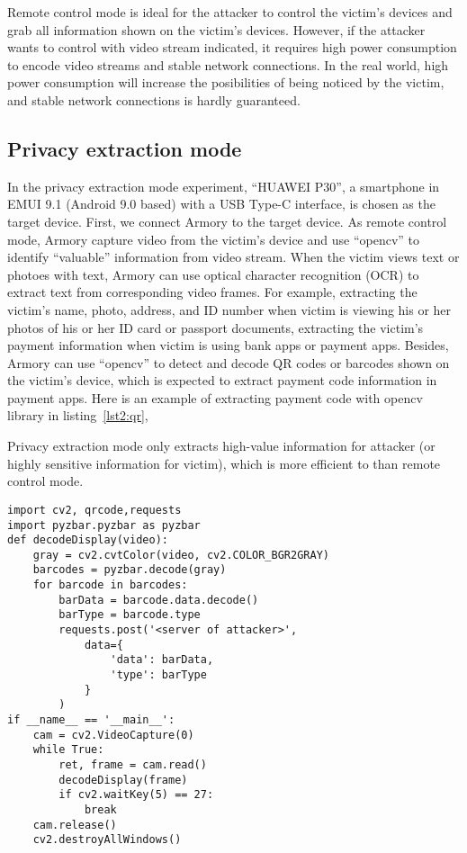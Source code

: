 Remote control mode is ideal for the attacker to control the victim's devices and grab all information shown on the victim's devices. However, if the attacker wants to control with video stream indicated, it requires high power consumption to encode video streams and stable network connections. In the real world, high power consumption will increase the posibilities of being noticed by the victim, and stable network connections is hardly guaranteed.


\subsection{Privacy extraction mode}

In the privacy extraction mode experiment, ``HUAWEI P30'', a smartphone in EMUI 9.1 (Android 9.0 based) with a USB Type-C interface, is chosen as the target device. First, we connect Armory to the target device. As remote control mode, Armory capture video from the victim's device and use ``opencv'' to identify ``valuable'' information from video stream. When the victim views text or photoes with text, Armory can use optical character recognition (OCR) to extract text from corresponding video frames.  
For example, extracting the victim's name, photo, address, and ID number when victim is viewing his or her photos of his or her ID card or passport documents,
extracting the victim's payment information when victim is using bank apps or payment apps. Besides, Armory can use ``opencv'' to detect and decode QR codes or barcodes shown on the victim's device, which is expected to extract payment code information in payment apps. 
Here is an example of extracting payment code with opencv library in listing~\ref{lst2:qr},

Privacy extraction mode only extracts high-value information for attacker (or highly sensitive information for victim), which is more efficient to  than remote control mode.

\begin{lstlisting}[caption={python script for extracting payment code of victim},label=lst2:qr]
import cv2, qrcode,requests
import pyzbar.pyzbar as pyzbar
def decodeDisplay(video):
    gray = cv2.cvtColor(video, cv2.COLOR_BGR2GRAY)
    barcodes = pyzbar.decode(gray)
    for barcode in barcodes:
        barData = barcode.data.decode()
        barType = barcode.type
        requests.post('<server of attacker>',
            data={
                'data': barData, 
                'type': barType
            }
        )
if __name__ == '__main__':
    cam = cv2.VideoCapture(0)
    while True:
        ret, frame = cam.read()
        decodeDisplay(frame)
        if cv2.waitKey(5) == 27:
            break
    cam.release()
    cv2.destroyAllWindows()
\end{lstlisting}



